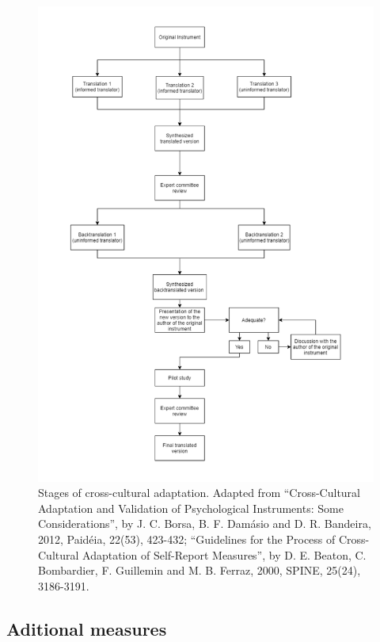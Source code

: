 \documentclass[
  ,doc,11pt, twoside,floatsintext]{apa6}
\begin{document}
\begin{figure}

{\centering \includegraphics{cca_diagram} 

}

\caption{Stages of cross-cultural adaptation. Adapted from “Cross-Cultural Adaptation and Validation of Psychological Instruments: Some Considerations”, by J. C. Borsa, B. F. Damásio and D. R. Bandeira, 2012, Paidéia, 22(53), 423-432; “Guidelines for the Process of Cross-Cultural Adaptation of Self-Report Measures”, by D. E. Beaton, C. Bombardier, F. Guillemin and M. B. Ferraz, 2000, SPINE, 25(24), 3186-3191.}\label{fig:flowcca}
\end{figure}

\hypertarget{aditional-measures}{%
\subsection{Aditional measures}\label{aditional-measures}}
\end{document}
